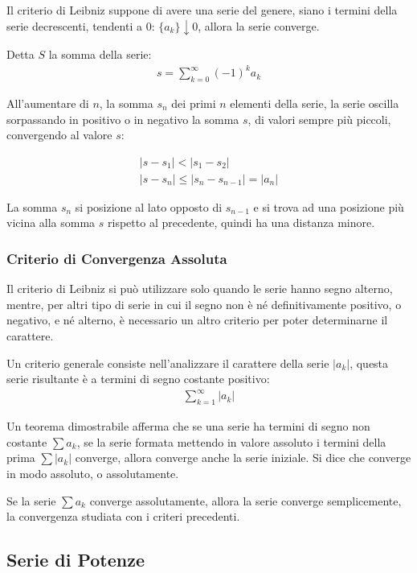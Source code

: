 \documentclass{article}
\numberwithin{equation}{subsection}
\begin{document}
Il criterio di Leibniz suppone di avere una serie del genere, siano i termini della serie decrescenti, tendenti a 0: $\{a_k\}\downarrow0$, allora la serie converge. 


Detta $S$ la somma della serie:
\begin{gather*}
    s=\displaystyle\sum_{k=0}^\infty(-1)^ka_k
\end{gather*}

All'aumentare di $n$, la somma $s_n$ dei primi $n$ elementi della serie, la serie oscilla sorpassando in positivo o in negativo la somma $s$, di valori sempre più piccoli, convergendo al valore $s$:

\begin{gather*}
    |s-s_1| < |s_1-s_2|\\
    |s-s_n| \leq |s_n-s_{n-1}|=|a_n|
\end{gather*}

La somma $s_n$ si posizione al lato opposto di $s_{n-1}$ e si trova ad una posizione più vicina alla somma $s$ rispetto al precedente, quindi ha una distanza minore. 

\subsubsection{Criterio di Convergenza Assoluta}

Il criterio di Leibniz si può utilizzare solo quando le serie hanno segno alterno, mentre, per altri tipo di serie in cui il segno non è né definitivamente positivo, o negativo, e né alterno, è necessario un altro criterio per poter determinarne il carattere. 

Un criterio generale consiste nell'analizzare il carattere della serie $|a_k|$, questa serie risultante è a termini di segno costante positivo:
\begin{gather*}
    \displaystyle\sum_{k=1}^\infty|a_k|
\end{gather*}

Un teorema dimostrabile afferma che se una serie ha termini di segno non costante $\sum a_k$, se la serie formata mettendo in valore assoluto i termini della prima $\sum|a_k|$ converge, allora converge anche la serie iniziale. Si dice che converge in modo assoluto, o assolutamente. 

Se la serie $\sum a_k$ converge assolutamente, allora la serie converge semplicemente, la convergenza studiata con i criteri precedenti. 

\subsection{Serie di Potenze}
\end{document}
